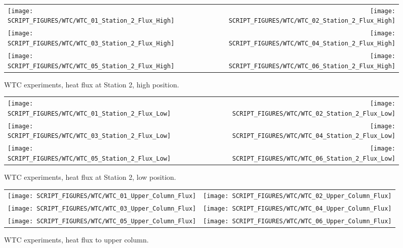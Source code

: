 \begin{figure}[h!]
\begin{tabular*}{\textwidth}{l@{\extracolsep{\fill}}r}
\texttt{[image: SCRIPT\_FIGURES/WTC/WTC\_01\_Station\_2\_Flux\_High]} &
\texttt{[image: SCRIPT\_FIGURES/WTC/WTC\_02\_Station\_2\_Flux\_High]} \\
\texttt{[image: SCRIPT\_FIGURES/WTC/WTC\_03\_Station\_2\_Flux\_High]} &
\texttt{[image: SCRIPT\_FIGURES/WTC/WTC\_04\_Station\_2\_Flux\_High]} \\
\texttt{[image: SCRIPT\_FIGURES/WTC/WTC\_05\_Station\_2\_Flux\_High]} &
\texttt{[image: SCRIPT\_FIGURES/WTC/WTC\_06\_Station\_2\_Flux\_High]}
\end{tabular*}
\caption[WTC experiments, heat flux at Station 2, high position]
{WTC experiments, heat flux at Station 2, high position.}
\label{NIST_WTC_Station_2_Flux_High}
\end{figure}

\newpage

\begin{figure}[p]
\begin{tabular*}{\textwidth}{l@{\extracolsep{\fill}}r}
\texttt{[image: SCRIPT\_FIGURES/WTC/WTC\_01\_Station\_2\_Flux\_Low]} &
\texttt{[image: SCRIPT\_FIGURES/WTC/WTC\_02\_Station\_2\_Flux\_Low]} \\
\texttt{[image: SCRIPT\_FIGURES/WTC/WTC\_03\_Station\_2\_Flux\_Low]} &
\texttt{[image: SCRIPT\_FIGURES/WTC/WTC\_04\_Station\_2\_Flux\_Low]} \\
\texttt{[image: SCRIPT\_FIGURES/WTC/WTC\_05\_Station\_2\_Flux\_Low]} &
\texttt{[image: SCRIPT\_FIGURES/WTC/WTC\_06\_Station\_2\_Flux\_Low]}
\end{tabular*}
\caption[WTC experiments, heat flux at Station 2, low position]
{WTC experiments, heat flux at Station 2, low position.}
\label{NIST_WTC_Station_2_Flux_Low}
\end{figure}

\begin{figure}[p]
\begin{tabular*}{\textwidth}{l@{\extracolsep{\fill}}r}
\texttt{[image: SCRIPT\_FIGURES/WTC/WTC\_01\_Upper\_Column\_Flux]} &
\texttt{[image: SCRIPT\_FIGURES/WTC/WTC\_02\_Upper\_Column\_Flux]} \\
\texttt{[image: SCRIPT\_FIGURES/WTC/WTC\_03\_Upper\_Column\_Flux]} &
\texttt{[image: SCRIPT\_FIGURES/WTC/WTC\_04\_Upper\_Column\_Flux]} \\
\texttt{[image: SCRIPT\_FIGURES/WTC/WTC\_05\_Upper\_Column\_Flux]} &
\texttt{[image: SCRIPT\_FIGURES/WTC/WTC\_06\_Upper\_Column\_Flux]}
\end{tabular*}
\caption[WTC experiments, heat flux to upper column]
{WTC experiments, heat flux to upper column.}
\label{NIST_WTC_Upper_Column_Flux}
\end{figure}

